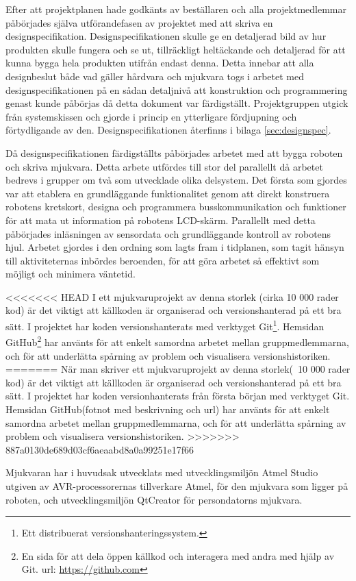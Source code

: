 Efter att projektplanen hade godkänts av beställaren och alla projektmedlemmar påbörjades själva utförandefasen av projektet med att skriva en designspecifikation. Designspecifikationen skulle ge en detaljerad bild av hur produkten skulle fungera och se ut, tillräckligt heltäckande och detaljerad för att kunna bygga hela produkten utifrån endast denna. Detta innebar att alla designbeslut både vad gäller hårdvara och mjukvara togs i arbetet med designspecifikationen på en sådan detaljnivå att konstruktion och programmering genast kunde påbörjas då detta dokument var färdigställt. Projektgruppen utgick från systemskissen och gjorde i princip en ytterligare fördjupning och förtydligande av den. Designspecifikationen återfinns i bilaga \ref{sec:designspec}.

Då designspecifikationen färdigställts påbörjades arbetet med att bygga roboten och skriva mjukvara. Detta arbete utfördes till stor del parallellt då arbetet bedrevs i grupper om två som utvecklade olika delsystem. Det första som gjordes var att etablera en grundläggande funktionalitet genom att direkt konstruera robotens kretskort, designa och programmera busskommunikation och funktioner för att mata ut information på robotens LCD-skärm. Parallellt med detta påbörjades inläsningen av sensordata och grundläggande kontroll av robotens hjul. Arbetet gjordes i den ordning som lagts fram i tidplanen, som tagit hänsyn till aktiviteternas inbördes beroenden, för att göra arbetet så effektivt som möjligt och minimera väntetid. 

<<<<<<< HEAD
I ett mjukvaruprojekt av denna storlek (cirka 10 000 rader kod) är det viktigt att källkoden är organiserad och versionshanterad på ett bra sätt. I projektet har koden versionshanterats med verktyget Git\footnote{Ett distribuerat versionshanteringssystem.}. Hemsidan GitHub\footnote{En sida för att dela öppen källkod och interagera med andra med hjälp av Git. url: \url{https://github.com}} har använts för att enkelt samordna arbetet mellan gruppmedlemmarna, och för att underlätta spårning av problem och visualisera versionshistoriken.
=======
När man skriver ett mjukvaruprojekt av denna storlek(~10 000 rader kod) är det viktigt att källkoden är organiserad och versionshanterad på ett bra sätt. I projektet har koden versionhanterats från första början med verktyget Git. Hemsidan GitHub(fotnot med beskrivning och url) har använts för att enkelt samordna arbetet mellan gruppmedlemmarna, och för att underlätta spårning av problem och visualisera versionshistoriken.
>>>>>>> 887a0130de689d03cf6aeaabd8a0a99251e17f66

Mjukvaran har i huvudsak utvecklats med utvecklingsmiljön Atmel Studio utgiven av AVR-processorernas tillverkare Atmel, för den mjukvara som ligger på roboten, och utvecklingsmiljön QtCreator för persondatorns mjukvara.